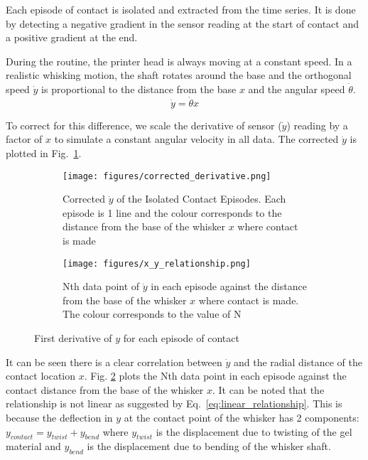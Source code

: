 \documentclass[runningheads]{llncs}
\begin{document}
Each episode of contact is isolated and extracted from the time series. It is done by detecting a negative gradient in the sensor reading at the start of contact and a positive gradient at the end. 

During the routine, the printer head is always moving at a constant speed. In a realistic whisking motion, the shaft rotates around the base and the orthogonal speed \(\dot{y}\) is proportional to the distance from the base \(x\) and the angular speed \(\dot{\theta}\).
\begin{equation}\label{eq:linear_relationship}
\dot{y} = \dot{\theta}x
\end{equation}

To correct for this difference, we scale the derivative of sensor (\(\dot{y}\)) reading by a factor of \(x\) to simulate a constant angular velocity in all data. The corrected \(\dot{y}\) is plotted in Fig.~\ref{fig:corrected_derivative.png}.

\begin{figure}
    \centering
    \begin{subfigure}[t]{.48\textwidth}
        \centering
        \texttt{[image: figures/corrected\_derivative.png]}
        \caption{Corrected \(\dot{y}\) of the Isolated Contact Episodes. Each episode is 1 line and the colour corresponds to the distance from the base of the whisker \(x\) where contact is made}
        \label{fig:corrected_derivative.png}
    \end{subfigure}
    \hspace{3pt}
    \begin{subfigure}[t]{.48\textwidth}
        \centering
        \texttt{[image: figures/x\_y\_relationship.png]}
        \caption{Nth data point of \(\dot{y}\) in each episode against the distance from the base of the whisker \(x\) where contact is made. The colour corresponds to the value of N}
        \label{fig:x_y_relationship.png}
    \end{subfigure}
    \vspace{-5pt}
    \caption{First derivative of \(y\) for each episode of contact}
    \label{fig:episode_analysis}
\end{figure}


It can be seen there is a clear correlation between \(\dot{y}\) and the radial distance of the contact location \(x\). Fig. \ref*{fig:x_y_relationship.png} plots the Nth data point in each episode against the contact distance from the base of the whisker \(x\). It can be noted that the relationship is not linear as suggested by Eq.~\ref*{eq:linear_relationship}. This is because the deflection in \(y\) at the contact point of the whisker has 2 components: \(y_{contact} = y_{twist} + y_{bend}\) where \(y_{twist}\) is the displacement due to twisting of the gel material and \(y_{bend}\) is the displacement due to bending of the whisker shaft.
\end{document}
